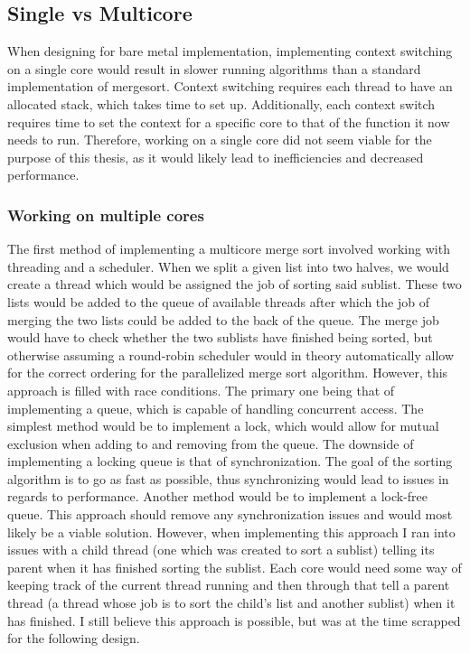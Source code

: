 \subsection{Single vs Multicore}
 When designing for bare metal implementation, implementing context switching on
 a single core would result in slower running algorithms than a standard
 implementation of mergesort. Context switching requires each thread to have an
 allocated stack, which takes time to set up. Additionally, each context switch
 requires time to set the context for a specific core to that of the function it
 now needs to run. Therefore, working on a single core did not seem viable for
 the purpose of this thesis, as it would likely lead to inefficiencies and
 decreased performance.

\subsubsection{Working on multiple cores}
The first method of implementing a multicore merge sort involved working with
threading and a scheduler. When we split a given list into two halves, we would
create a thread which would be assigned the job of sorting said sublist. These
two lists would be added to the queue of available threads after which the job
of merging the two lists could be added to the back of the queue. The merge job
would have to check whether the two sublists have finished being sorted, but
otherwise assuming a round-robin scheduler would in theory automatically allow
for the correct ordering for the parallelized merge sort algorithm. However,
this approach is filled with race conditions. The primary one being that of
implementing a queue, which is capable of handling concurrent access. The
simplest method would be to implement a lock, which would allow for mutual
exclusion when adding to and removing from the queue. The downside of
implementing a locking queue is that of synchronization. The goal of the sorting
algorithm is to go as fast as possible, thus synchronizing would lead to issues
in regards to performance. Another method would be to implement a lock-free
queue. This approach should remove any synchronization issues and would most
likely be a viable solution. However, when implementing this approach I ran into
issues with a child thread (one which was created to sort a sublist) telling its
parent when it has finished sorting the sublist. Each core would need some way
of keeping track of the current thread running and then through that tell a
parent thread (a thread whose job is to sort the child's list and another
sublist) when it has finished. I still believe this approach is possible, but
was at the time scrapped for the following design.


